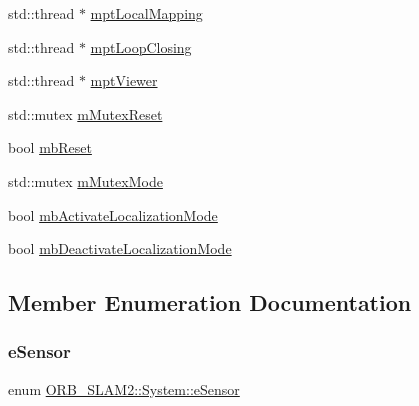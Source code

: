 \begin{DoxyCompactItemize}
std\+::thread $\ast$ \mbox{\hyperlink{class_o_r_b___s_l_a_m2_1_1_system_a920fdcb880bd1fa57bebfa2c90057c19}{mpt\+Local\+Mapping}}
\item 
std\+::thread $\ast$ \mbox{\hyperlink{class_o_r_b___s_l_a_m2_1_1_system_a834f5f1017e9b36f9be8c7ce10fc1418}{mpt\+Loop\+Closing}}
\item 
std\+::thread $\ast$ \mbox{\hyperlink{class_o_r_b___s_l_a_m2_1_1_system_a734cf8bef072b5c49c0ecb21f0f1aa7d}{mpt\+Viewer}}
\item 
std\+::mutex \mbox{\hyperlink{class_o_r_b___s_l_a_m2_1_1_system_ad157436a5aba7af15a52b712c0f5d6c8}{m\+Mutex\+Reset}}
\item 
bool \mbox{\hyperlink{class_o_r_b___s_l_a_m2_1_1_system_a2386c300525a863f84a50ae4fb00892c}{mb\+Reset}}
\item 
std\+::mutex \mbox{\hyperlink{class_o_r_b___s_l_a_m2_1_1_system_a72f99b0f2e49cf8480f696662475243e}{m\+Mutex\+Mode}}
\item 
bool \mbox{\hyperlink{class_o_r_b___s_l_a_m2_1_1_system_a375f5e834f834d35227d8500be331d4d}{mb\+Activate\+Localization\+Mode}}
\item 
bool \mbox{\hyperlink{class_o_r_b___s_l_a_m2_1_1_system_a3ddf79ff90f548529490fa6910f52bb8}{mb\+Deactivate\+Localization\+Mode}}
\end{DoxyCompactItemize}


\subsection{Member Enumeration Documentation}
\mbox{\label{class_o_r_b___s_l_a_m2_1_1_system_a3f14b84bb9663e1129e649e592bd14cf}} 
\subsubsection{\texorpdfstring{e\+Sensor}{eSensor}}
{\footnotesize\ttfamily enum \mbox{\hyperlink{class_o_r_b___s_l_a_m2_1_1_system_a3f14b84bb9663e1129e649e592bd14cf}{O\+R\+B\+\_\+\+S\+L\+A\+M2\+::\+System\+::e\+Sensor}}}

